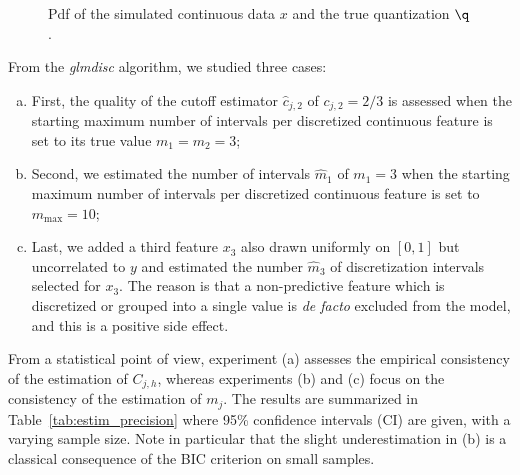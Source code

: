 \begin{figure}
\centering
{}
\caption{\label{fig:exp_sim} Pdf of the simulated continuous data $x$ and the true quantization $\q$.}
\end{figure}


From the \textit{glmdisc} algorithm, we studied three cases:
\begin{enumerate}[(a)]
    \item First, the quality of the cutoff estimator $\hat{c}_{j,2}$ of $c_{j,2} = 2/3$ is assessed when the starting maximum number of intervals per discretized continuous feature is set to its true value $m_1=m_2= 3$;
    \item Second, we estimated the number of intervals $\hat{m}_1$ of $m_1=3$ when the starting maximum number of intervals per discretized continuous feature is set to $m_{\text{max}} = 10$; 
    \item Last, we added a third feature $x_3$ also drawn uniformly on $[0,1]$ but uncorrelated to $y$ and estimated the number $\hat{m}_3$ of discretization intervals selected for $x_3$. The reason is that a non-predictive feature which is discretized or grouped into a single value is \textit{de facto} excluded from the model, and this is a positive side effect.
\end{enumerate}
From a statistical point of view, experiment (a) assesses the empirical consistency of the estimation of $C_{j,h}$, whereas experiments (b) and (c) focus on the consistency of the estimation of $m_j$. The results are summarized in Table~\ref{tab:estim_precision} where 95\% confidence intervals (CI) are given, with a varying sample size. Note in particular that the slight underestimation in (b) is a classical consequence of the BIC criterion on small samples. 

